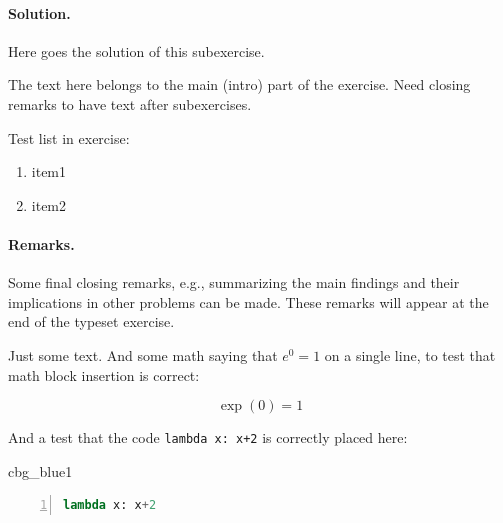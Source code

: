 \n\documentclass[%
oneside,                 %
final,                   %
10pt]{article}
\newenvironment{_cod_tight}[1]{
   \def\FrameCommand{\colorbox{#1}}
   \FrameRule0.6pt\MakeFramed {\FrameRestore}\vskip3mm}
   {\vskip0mm\endMakeFramed}
\newenvironment{cod}[1]{
\bgroup\rmfamily
\fboxsep=0mm\relax
\begin{_cod_tight}{#1}
\list{}{\parsep=-2mm\parskip=0mm\topsep=0pt\leftmargin=2mm
\rightmargin=2\leftmargin\leftmargin=4pt\relax}
\item\relax}
{\endlist\end{_cod_tight}\egroup}
\newenvironment{doconceexercise}{}{}
\theoremstyle{definition}
\begin{document}
\begin{enumerate}
\begin{doconceexercise}
\paragraph{Solution.}
Here goes the solution of this subexercise.

The text here belongs to the main (intro) part of the exercise. Need
closing remarks to have text after subexercises.

Test list in exercise:

\begin{enumerate}
\item item1

\item item2
\end{enumerate}

\noindent


\paragraph{Remarks.}
Some final closing remarks, e.g., summarizing the main findings
and their implications in other problems can be made. These
remarks will appear at the end of the typeset exercise.

\end{doconceexercise}

\begin{doconceexercise}



Just some text. And some math saying that $e^0=1$ on a single line,
to test that math block insertion is correct:

\[ \exp{(0)} = 1 \]

And a test that the code \texttt{lambda x: x+2} is correctly placed here:



\begin{cod}{cbg_blue1}\begin{lstlisting}[language=Python,style=myspeciallststyle,numbers=left,numberstyle=\tiny,stepnumber=3,numbersep=15pt,xleftmargin=1mm]
lambda x: x+2

\end{lstlisting}\end{cod}
\noindent



\end{doconceexercise}
\end{enumerate}
\end{document}
